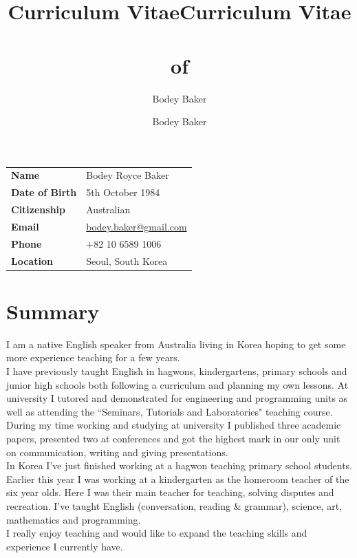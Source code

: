 \documentclass[10pt, a4paper]{report}
\title{Curriculum Vitae}
\author{Bodey Baker}
\title{Curriculum Vitae\\~\\of}
\author{Bodey Baker}%
\begin{document}
\begin{minipage}{13cm}
\begin{tabular}{ll}
{\bf Name} & Bodey Royce Baker \\ 
{\bf Date of Birth} & 5th October 1984 \\
{\bf Citizenship} & Australian \\
{\bf Email} & \href{mailto:bodey.baker@gmail.com}{bodey.baker@gmail.com} \\
{\bf Phone} & +82 10 6589 1006 \\
{\bf Location} & Seoul, South Korea \\
\end{tabular}
\section*{Summary}
I am a native English speaker from Australia living in Korea hoping to get some more experience teaching for a few years. \\

I have previously taught English in hagwons, kindergartens, primary schools and junior high schools both following a curriculum and planning my own lessons. At university I tutored and demonstrated for engineering and programming units as well as attending the ``Seminars, Tutorials and Laboratories" teaching course. During my time working and studying at university I published three academic papers, presented two at conferences and got the highest mark in our only unit on communication, writing and giving presentations. \\

In Korea I've just finished working at a hagwon teaching primary school students. Earlier this year I was working at a kindergarten as the homeroom teacher of the six year olds. Here I was their main teacher for teaching, solving disputes and recreation. I've taught English (conversation, reading 
\& grammar), science, art, mathematics and programming. \\

I really enjoy teaching and would like to expand the teaching skills and experience I currently have.
\end{minipage}
\hfill
\begin{minipage}{50mm}
{%
\setlength{\fboxsep}{0pt}%
\setlength{\fboxrule}{1pt}%
%
}%
\end{minipage}
\end{document}
